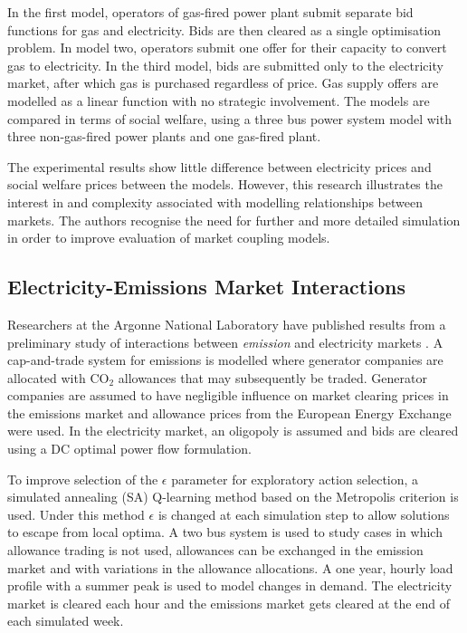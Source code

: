 In the first model, operators of gas-fired power plant submit separate bid
functions for gas and electricity.  Bids are then cleared as a single
optimisation problem.  In model two, operators submit one offer for their
capacity to convert gas to electricity.  In the third model, bids are
submitted only to the electricity market, after which gas is purchased
regardless of price.  Gas supply offers are modelled as a linear function with
no strategic involvement.  The models are compared in terms of social welfare,
using a three bus power system model with three non-gas-fired power plants and
one gas-fired plant.

The experimental results show little difference between electricity prices and
social welfare prices between the models.  However, this research illustrates
the interest in and complexity associated with modelling relationships between
markets.  The authors recognise the need for further and more detailed
simulation in order to improve evaluation of market coupling models.

\subsection{Electricity-Emissions Market Interactions}
Researchers at the Argonne National Laboratory have published results from a
preliminary study of interactions between \textit{emission} and electricity
markets \cite{wang:09}.  A cap-and-trade system for emissions is modelled where
generator companies are allocated with $\mbox{CO}_2$ allowances that may
subsequently be traded.  Generator companies are assumed to have negligible
influence on market clearing prices in the emissions market and allowance
prices from the European Energy Exchange were used.  In the electricity market,
an oligopoly is assumed and bids are cleared using a DC optimal power flow
formulation.

To improve selection of the $\epsilon$ parameter for exploratory
action selection, a simulated annealing (SA) Q-learning method based on the
Metropolis criterion \cite{guo:sa} is used. Under this method $\epsilon$ is
changed at each simulation step to allow solutions to escape from local
optima.  A two bus system is used to study cases in which allowance trading
is not used, allowances can be exchanged in the emission market and with
variations in the allowance allocations.  A one year, hourly load profile with
a summer peak is used to model changes in demand.  The electricity market is
cleared each hour and the emissions market gets cleared at the end of each
simulated week.

